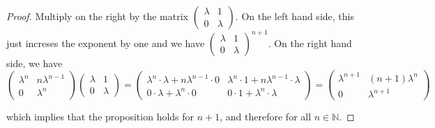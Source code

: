 \documentclass{article}
\newcommand{\N}{\mathbb{N}}
\begin{document}
\begin{enumerate}
\begin{proof}
        Multiply on the right by the matrix $\begin{pmatrix}
            \lambda & 1 \\
            0 & \lambda
        \end{pmatrix}$. On the left hand side, this just increses the exponent by one and we have $\begin{pmatrix}
            \lambda & 1 \\
            0 & \lambda
        \end{pmatrix}^{n + 1}$. On the right hand side, we have
        $$\begin{pmatrix}
            \lambda^n & n \lambda^{n - 1} \\
            0 & \lambda^n
        \end{pmatrix}
        \begin{pmatrix}
            \lambda & 1 \\
            0 & \lambda
        \end{pmatrix}
        = \begin{pmatrix}
            \lambda^n \cdot \lambda + n \lambda^{n - 1} \cdot 0 & \lambda^n \cdot 1 + n \lambda^{n - 1} \cdot \lambda \\
            0 \cdot \lambda + \lambda^n \cdot 0 & 0 \cdot 1 + \lambda^n \cdot \lambda
        \end{pmatrix}
        = \begin{pmatrix}
            \lambda^{n + 1} & (n + 1)\lambda^{n} \\
            0 & \lambda^{n + 1}
        \end{pmatrix}$$

        which implies that the proposition holds for $n + 1$, and therefore for all $n \in \N$.   
        
    \end{proof}


\end{enumerate}
\end{document}
